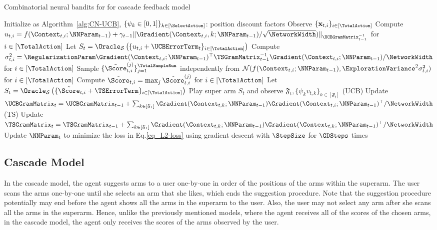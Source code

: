 \documentclass{article}
\theoremstyle{plain}
\begin{document}
\begin{algorithm*}[ht]
   \caption{Combinatorial neural bandits for for cascade feedback model}
   \label{alg:CNB for cascade model}
\begin{algorithmic}
    \STATE Initialize as Algorithm~\ref{alg:CN-UCB}, $\{ \psi_k \in [0,1] \}_{k \in [\SelectAction]} $: position discount factors
    \STATE Observe $\{ \mathbf{x}_{t,i} \}_{i \in [\TotalAction]}$
        \STATE Compute $u_{t,i} = f(\Context_{t,i}; \NNParam_{t-1}) + \gamma_{t-1} \| \Gradient(\Context_{t,i}, k; \NNParam_{t-1}) / \sqrt{\NetworkWidth}) \|_{\UCBGramMatrix_{t-1}^{-1}}$ for $i \in [\TotalAction]$
        \STATE Let $S_t = \Oracle_{\mathcal{S}} \left( \{u_{t,i} + \UCBErrorTerm_t \}_{i \in [\TotalAction]} \right)$
        \STATE Compute $ \sigma_{t,i}^2 = \RegularizationParam \Gradient(\Context_{t,i} ; \NNParam_{t-1})^\top \TSGramMatrix_{t-1}^{-1} \Gradient(\Context_{t,i}; \NNParam_{t-1}) / \NetworkWidth$ for $i \in [\TotalAction]$
        \STATE Sample $\{ \tilde{\Score}_{t,i}^{(j)}\}_{j=1}^{\TotalSampleNum}$ independently from $\mathcal{N}( f(\Context_{t,i}; \NNParam_{t-1}), \ExplorationVariance^2 \sigma_{t,i}^2)$ for $i \in [\TotalAction]$
        \STATE Compute $\tilde{\Score}_{t, i}= \max_{j} \tilde{\Score}_{t,i}^{(j)}$ for $i \in [\TotalAction]$    
        \STATE Let $S_t = \Oracle_{\mathcal{S}} \left( \{\tilde{\Score}_{t, i} + \TSErrorTerm \}_{i \in [\TotalAction]} \right)$
    \ENDIF
    \STATE Play super arm $S_t$ and observe $\mathfrak{F}_t, \{ \psi_k v_{t,k} \}_{k \in [\mathfrak{F}_t]}$
    \STATE (UCB) Update $\UCBGramMatrix_{t} = \UCBGramMatrix_{t-1} + \sum_{k \in [\mathfrak{F}_t]} \Gradient(\Context_{t,k}; \NNParam_{t-1})  \Gradient(\Context_{t,i}; \NNParam_{t-1})^\top / \NetworkWidth$
    \STATE (TS) Update $\TSGramMatrix_{t} = \TSGramMatrix_{t-1} + \sum_{k \in [\mathfrak{F}_t]} \Gradient(\Context_{t,k}; \NNParam_{t-1}) \Gradient (\Context_{t,k}; \NNParam_{t-1})^\top /\NetworkWidth$
    \STATE Update $\NNParam_{t}$ to minimize the loss in Eq.\eqref{eq_L2-loss} using gradient descent with $\StepSize$ for $\GDSteps$ times
  \ENDFOR
\end{algorithmic}
\end{algorithm*}

\subsection{Cascade Model}
In the cascade model, the agent suggests arms to a user one-by-one in order of the positions of the arms within the superarm.
The user scans the arms one-by-one until she selects an arm that she likes, which ends the suggestion procedure. Note that the suggestion procedure potentially may end before the agent shows all the arms in the superarm to the user. Also, the user may not select any arm after she scans all the arms in the superarm.
Hence, unlike the previously mentioned models, where the agent receives all of the scores of the chosen arms, 
in the cascade model, the agent only receives the scores of the arms observed by the user. 
\end{document}
